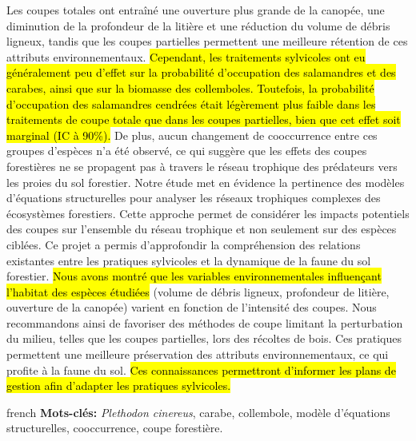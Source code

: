 Les coupes totales ont entraîné une ouverture plus grande de la canopée, une diminution de la profondeur de la litière et une réduction du volume de débris ligneux, 
tandis que les coupes partielles permettent une meilleure rétention de ces attributs environnementaux. 
\hl{Cependant, les traitements sylvicoles ont eu généralement peu d’effet sur la probabilité d’occupation des salamandres et des carabes, ainsi que sur la biomasse des collemboles. 
Toutefois, la probabilité d’occupation des salamandres cendrées était légèrement plus faible dans les traitements de coupe totale que dans les coupes partielles, bien que cet effet soit marginal (IC à 90\%).}
De plus, aucun changement de cooccurrence entre ces groupes d’espèces n’a été observé, ce qui suggère que les effets des coupes forestières ne se propagent pas à travers le réseau trophique des prédateurs vers les proies du sol forestier. 
Notre étude met en évidence la pertinence des modèles d’équations structurelles pour analyser les réseaux trophiques complexes des écosystèmes forestiers. 
Cette approche permet de considérer les impacts potentiels des coupes sur l’ensemble du réseau trophique et non seulement sur des espèces ciblées. 
Ce projet a permis d’approfondir la compréhension des relations existantes entre les pratiques sylvicoles et la dynamique de la faune du sol forestier. 
\hl{Nous avons montré que les variables environnementales influençant l’habitat des espèces étudiées} (volume de débris ligneux, profondeur de litière, ouverture de la canopée) varient en fonction de l’intensité des coupes. 
Nous recommandons ainsi de favoriser des méthodes de coupe limitant la perturbation du milieu, telles que les coupes partielles, lors des récoltes de bois. 
Ces pratiques permettent une meilleure préservation des attributs environnementaux, ce qui profite à la faune du sol. 
\hl{Ces connaissances permettront d’informer les plans de gestion afin d’adapter les pratiques sylvicoles.}


\begin{otherlanguage*}{french}
\textbf{Mots-clés:} \textit{Plethodon cinereus}, carabe, collembole, modèle d'équations structurelles, cooccurrence, coupe forestière.
\end{otherlanguage*}
